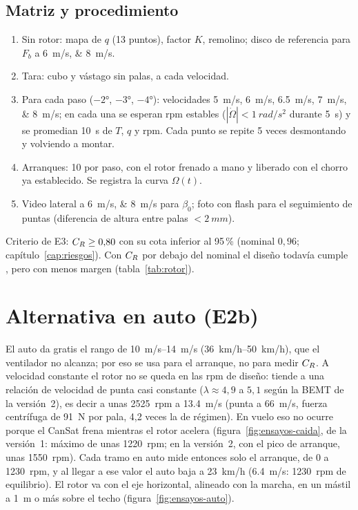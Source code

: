 \subsection{Matriz y procedimiento}
\begin{enumerate}
  \item Sin rotor: mapa de $q$ (13 puntos), factor $K$, remolino; disco de referencia para
        $F_b$ a \SIlist{6;8}{m/s}.
  \item Tara: cubo y vástago sin palas, a cada velocidad.
  \item Para cada paso ($\ang{-2}$, $\ang{-3}$, $\ang{-4}$): velocidades
        \SIlist{5;6;6.5;7;8}{m/s}; en cada una se esperan rpm estables
        ($|\dot\Omega|<\SI{1}{rad/s^2}$ durante \SI{5}{s}) y se promedian \SI{10}{s} de
        $T$, $q$ y rpm. Cada punto se repite 5 veces desmontando y volviendo a montar.
  \item Arranques: 10 por paso, con el rotor frenado a mano y liberado con el chorro
        ya establecido. Se registra la curva $\Omega(t)$.
  \item Video lateral a \SIlist{6;8}{m/s} para $\beta_0$; foto con flash para el
        seguimiento de puntas (diferencia de altura entre palas $<\SI{2}{mm}$).
\end{enumerate}
Criterio de E3: $C_{R}\ge0{,}80$ con su cota inferior al 95\,\% (nominal $0{,}96$; capítulo~\ref{cap:riesgos}).
Con $C_{R}$ por debajo del nominal el diseño todavía cumple , pero con menos
margen (tabla~\ref{tab:rotor}).

\section{Alternativa en auto (E2b)}\label{sec:ensayos-auto}
El auto da gratis el rango de \SIrange{10}{14}{m/s} (\SIrange{36}{50}{km/h}), que el
ventilador no alcanza; por eso se usa para el arranque, no para medir $C_{R}$. A velocidad
constante el rotor no se queda en las rpm de diseño: tiende a una relación de
velocidad de punta casi constante ($\lambda\approx4{,}9$ a $5{,}1$ según la BEMT de la versión~2), es decir a unas \num{2525}~rpm a
\SI{13.4}{m/s} (punta a \SI{66}{m/s}, fuerza centrífuga de \SI{91}{N} por pala, 4,2 veces
la de régimen). En vuelo eso no ocurre porque el CanSat frena mientras el rotor acelera
(figura~\ref{fig:ensayos-caida}, de la versión~1: máximo de unas \num{1220}~rpm; en la versión~2, con el pico de arranque, unas \num{1550}~rpm). Cada tramo en auto mide
entonces solo el arranque, de 0 a \num{1230}~rpm, y al llegar a ese valor el auto baja a
\SI{23}{km/h} (\SI{6.4}{m/s}: \num{1230}~rpm de equilibrio). El rotor va
con el eje horizontal, alineado con la marcha, en un mástil a \SI{1}{m} o más sobre el
techo (figura~\ref{fig:ensayos-auto}).

